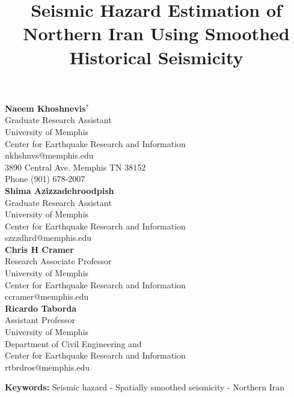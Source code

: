 \documentclass{article}
\title{Seismic Hazard Estimation of Northern Iran Using Smoothed Historical Seismicity}
\begin{document}
\maketitle


\newpage

\begin{center}
\textbf{Naeem Khoshnevis$^*$} \\ Graduate Research Assistant \\  University of Memphis \\ Center for Earthquake Research and Information \\   nkhshnvs@memphis.edu\\   3890 Central Ave. Memphis TN 38152 \\ Phone (901) 678-2007\\
\vspace{10 mm}
 \textbf{Shima Azizzadehroodpish}  \\ Graduate Research Assistant \\ University of Memphis \\ Center for Earthquake Research and Information \\ szzzdhrd@memphis.edu\\  
\vspace{10 mm}
\textbf{Chris H Cramer}   \\ Research  Associate  Professor \\  University of Memphis \\ Center for Earthquake Research and Information \\ ccramer@memphis.edu \\
\vspace{10 mm}
\textbf{Ricardo Taborda}   \\  Assistant  Professor \\  University of Memphis \\ Department of Civil Engineering and \\ Center for Earthquake Research and Information \\ rtbrdros@memphis.edu\\

\end{center}




\newpage


\begin{abstract}

\end{abstract}


\smallskip
\noindent \textbf{Keywords: } Seismic hazard - Spatially smoothed seismicity - Northern Iran





\newpage


{
\renewcommand{\bibname}{}


}
\end{document}
